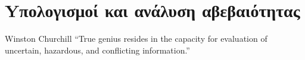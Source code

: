 \chapter{Yπολογισμοί και ανάλυση αβεβαιότητας}\label{ch:uncertaintyanalysis}

\begin{chapquote}{Winston Churchill}
“True genius resides in the capacity for evaluation of uncertain, hazardous, and conflicting
information.”
\end{chapquote}


\ifpdf
    \graphicspath{{Chapter4/Figs/Raster/}{Chapter4/Figs/PDF/}{Chapter4/Figs/}}
\else
    \graphicspath{{Chapter4/Figs/Vector/}{Chapter4/Figs/}}
\fi


